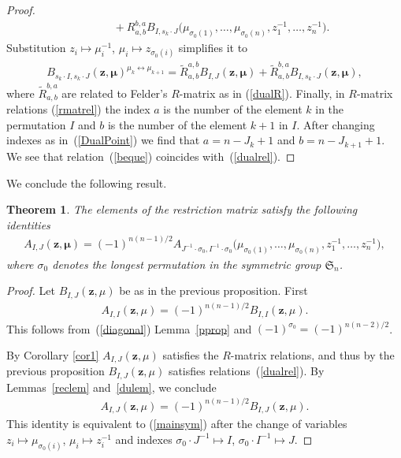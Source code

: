 \documentclass[10pt,a4paper]{amsart}
\def\zz{{\boldsymbol z}}
\def\mub{{\boldsymbol\mu}}
\numberwithin{equation}{section}
\newtheorem{Theorem}{Theorem}[section]
\begin{document}
\begin{proof}
\begin{gather*}
 \qquad\quad{}+R^{b,a}_{a,b} B_{I,s_k \cdot J}\big(\mu_{\sigma_{0}(1)},\dots,\mu_{\sigma_{0}(n)},z_{1}^{-1},\dots, z_{n}^{-1}\big).
\end{gather*}
Substitution $z_{i} \mapsto \mu_{i}^{-1}$, $\mu_{i} \mapsto z_{\sigma_{0}(i)}$ simplifies it to
\begin{gather} \label{beque}
B_{s_k \cdot I ,s_k\cdot J }(\zz,\mub)^{\mu_{k}\leftrightarrow \mu_{k+1}}=\tilde{R}^{a,b}_{a,b} B_{I,J}(\zz,\mub)+\tilde{R}^{b,a}_{a,b} B_{I,s_k \cdot J}(\zz,\mub),
\end{gather}
where $\tilde{R}^{b,a}_{a,b}$ are related to Felder's $R$-matrix as in (\ref{dualR}). Finally, in $R$-matrix relations (\ref{rmatrel}) the index $a$ is the number of the element $k$ in the permutation $I$ and $b$ is the number of the element $k+1$ in $I$. After changing indexes as in~(\ref{DualPoint}) we find that $a=n-J_k+1$ and $b=n-J_{k+1}+1$. We see that relation~(\ref{beque}) coincides with~(\ref{dualrel}).
\end{proof}

We conclude the following result.
\begin{Theorem} \label{duthrm} The elements of the restriction matrix satisfy the following identities
\begin{gather} \label{mainsym}
A_{I,J}(\zz,\mub)=(-1)^{n(n-1)/2} A_{J^{-1}\cdot \sigma_{0},I^{-1}\cdot \sigma_{0}}\big(\mu_{\sigma_{0}(1)},\dots,\mu_{\sigma_{0}(n)},z^{-1}_1,\dots, z_{n}^{-1}\big),
\end{gather}
where $\sigma_{0}$ denotes the longest permutation in the symmetric group $\mathfrak{S}_{n}$.
\end{Theorem}

\begin{proof}Let $B_{I,J}(\zz,\mu)$ be as in the previous proposition. First \begin{gather*} A_{I,I}(\zz,\mu)=(-1)^{n(n-1)/2} B_{I,I}(\zz,\mu).\end{gather*} This follows from~(\ref{diagonal}) Lemma~\ref{pprop} and $(-1)^{\sigma_{0}}=(-1)^{n(n-2)/2}$.

By Corollary \ref{cor1} $A_{I,J}(\zz,\mu)$ satisfies the $R$-matrix relations, and thus by the previous proposition $B_{I,J}(\zz,\mu)$ satisfies relations~(\ref{dualrel}).
By Lemmas~\ref{reclem} and~\ref{dulem}, we conclude
\begin{gather*}
A_{I,J}(\zz,\mu)=(-1)^{n(n-1)/2} B_{I,J}(\zz,\mu).
\end{gather*}
This identity is equivalent to (\ref{mainsym}) after the change of variables $z_{i}\mapsto \mu_{\sigma_{0}(i)}$, $\mu_{i}\mapsto z_i^{-1}$ and indexes $\sigma_{0}\cdot J^{-1}\mapsto I$, $\sigma_{0}\cdot I^{-1}\mapsto J$.
\end{proof}
\end{document}
